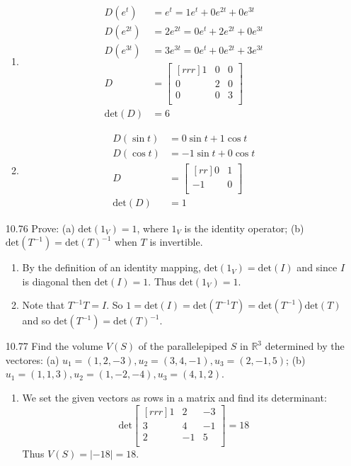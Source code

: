 \documentclass[12pt]{article}
\theoremstyle{definition}
\theoremstyle{plain}
\begin{document}
\begin{enumerate}
\begin{enumerate}
	\item
	\begin{align*}
	D(e^t)&=e^t=1e^t+0e^{2t}+0e^{3t}\\
	D(e^{2t})&=2e^{2t}=0e^t+2e^{2t}+0e^{3t}\\
	D(e^{3t})&=3e^{3t}=0e^t+0e^{2t}+3e^{3t}\\
	D&=\begin{bmatrix}[rrr]1&0&0\\0&2&0\\0&0&3\\\end{bmatrix}\\
	\mathrm{det}(D)&=6
	\end{align*}
	\item
	\begin{align*}
	D(\sin t) &= 0\sin t + 1\cos t\\
	D(\cos t) &= -1\sin t + 0\cos t\\
	D&=\begin{bmatrix}[rr]0&1\\-1&0\\\end{bmatrix}\\
	\mathrm{det}(D)&= 1
	\end{align*}
	\end{enumerate}
	
\item[10.76]Prove: (a) $\mathrm{det}(1_V)=1$, where $1_V$ is the identity operator; (b) $\mathrm{det}(T^{-1})=\mathrm{det}(T)^{-1}$ when $T$ is invertible.
	\begin{enumerate}
	\item By the definition of an identity mapping, $\mathrm{det}(1_V) = \mathrm{det}(I)$ and since $I$ is diagonal then $\mathrm{det}(I)=1$. Thus $\mathrm{det}(1_V)=1$.
	\item Note that $T^{-1}T=I$. So $1=\mathrm{det}(I)=\mathrm{det}(T^{-1}T) = \mathrm{det}(T^{-1})\mathrm{det}(T)$ and so $\mathrm{det}(T^{-1}) = \mathrm{det}(T)^{-1}$.
	\end{enumerate}
	
\item[10.77]Find the volume $V(S)$ of the parallelepiped $S$ in $\mathbb{R}^3$ determined by the vectores: (a) $u_1=(1,2,-3),u_2=(3,4,-1),u_3=(2,-1,5)$; (b) $u_1=(1,1,3),u_2=(1,-2,-4),u_3=(4,1,2)$.
	\begin{enumerate}
	\item We set the given vectors as rows in a matrix and find its determinant:
	\[ \mathrm{det}\begin{bmatrix}[rrr]1&2&-3\\3&4&-1\\2&-1&5\\\end{bmatrix} = 18 \]
	Thus $V(S) = |-18| = 18$.
	\end{enumerate}
	

\end{enumerate}
\end{document}
